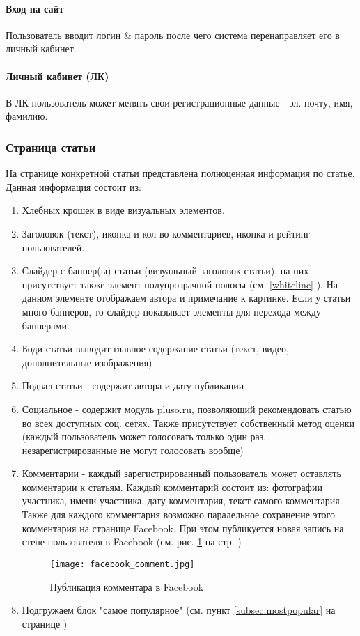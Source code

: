 \documentclass[DIV=calc, paper=a4, fontsize=11pt]{scrartcl} %
\begin{document}
\paragraph{Вход на сайт}
Пользователь вводит логин \& пароль после чего система перенаправляет его в личный кабинет.

\paragraph{Личный кабинет (ЛК)}
В ЛК пользователь может менять свои регистрационные данные - эл. почту, имя, фамилию.


\subsubsection{Страница статьи}
На странице конкретной статьи представлена полноценная информация по статье. Данная информация состоит из:

\begin{enumerate}
    \item Хлебных крошек в виде визуальных элементов. 
    \item Заголовок (текст), иконка и кол-во комментариев, иконка и рейтинг пользователей.
    \item Слайдер с баннер(ы) статьи (визуальный заголовок статьи), на них присутствует также элемент полупрозрачной полосы (см. \ref{whiteline} ). На данном элементе отображаем автора и примечание к картинке. Если у статьи много баннеров, то слайдер показывает элементы для перехода между баннерами.
    \item Боди статьи выводит главное содержание статьи (текст, видео, дополнительные изображения)
    \item Подвал статьи - содержит автора и дату публикации
    \item Социальное - содержит модуль pluso.ru, позволяющий рекомендовать статью во всех доступных соц. сетях. Также присутствует собственный метод оценки (каждый пользователь может голосовать только один раз, незарегистрированные не могут голосовать вообще)
    \item Комментарии - каждый зарегистрированный пользователь может оставлять комментарии к статьям. Каждый комментарий состоит из: фотографии участника, имени участника, дату комментария, текст самого комментария. Также для каждого комментария возможно паралельное сохранение этого комментария на странице Facebook. При этом публикуется новая запись на стене пользователя в Facebook (см. рис. \ref{fig:facebook_comment.jpg} на стр. \pageref{fig:facebook_comment.jpg})
        \begin{figure}[ht!]
        \centering
        \texttt{[image: facebook\_comment.jpg]}
        \caption{Публикация комментара в Facebook \label{fig:facebook_comment.jpg}}
        \end{figure}
    \item Подгружаем блок "самое популярное" (см. пункт \ref{subsec:mostpopular} на странице \pageref{subsec:mostpopular} )
\end{enumerate}
\end{document}
